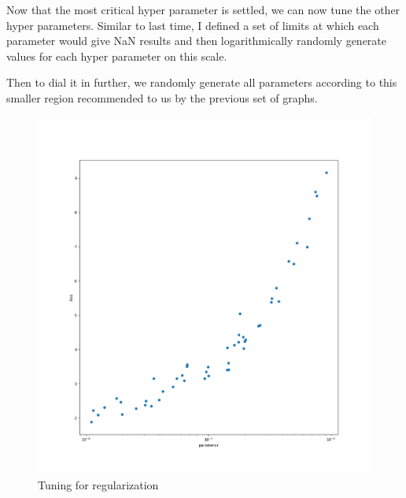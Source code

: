\documentclass{article}
\begin{document}
Now that the most critical hyper parameter is settled, we can now tune the other hyper parameters.
Similar to last time, I defined a set of limits at which each parameter would give NaN results and then logarithmically randomly generate values for each hyper parameter on this scale.

Then to dial it in further, we randomly generate all parameters according to this smaller region recommended to us by the previous set of graphs.

\begin{figure}[H]
	\centering
	\includegraphics[width=\textwidth]{reg.png}
	\caption{Tuning for regularization}
\end{figure}
\end{document}
